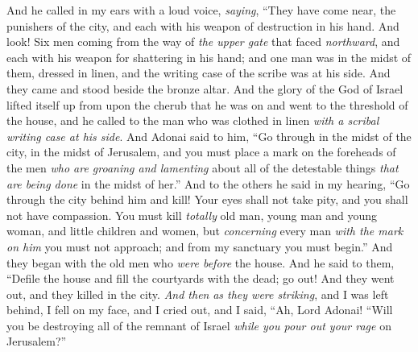 \begin{biblechapter} %
 And he called in my ears with a loud voice, \textit{saying}, “They have come near, the punishers of the city, and each with his weapon of destruction in his hand.
\verse And look! Six men coming from the way of \textit{the upper gate} that faced \textit{northward}, and each with his weapon for shattering in his hand; and one man was in the midst of them, dressed in linen, and the writing case of the scribe was at his side. And they came and stood beside the bronze altar.
\verse And the glory of the God of Israel lifted itself up from upon the cherub that he was on and went to the threshold of the house, and he called to the man who was clothed in linen \textit{with a scribal writing case at his side}.
\verse And Adonai said to him, “Go through in the midst of the city, in the midst of Jerusalem, and you must place a mark on the foreheads of the men \textit{who are groaning and lamenting} about all of the detestable things \textit{that are being done} in the midst of her.”
\verse And to the others he said in my hearing, “Go through the city behind him and kill! Your eyes shall not take pity, and you shall not have compassion.
\verse You must kill \textit{totally} old man, young man and young woman, and little children and women, but \textit{concerning} every man \textit{with the mark on him} you must not approach; and from my sanctuary you must begin.” And they began with the old men who \textit{were before} the house.
\verse And he said to them, “Defile the house and fill the courtyards with the dead; go out! And they went out, and they killed in the city.
\verse \textit{And then} \textit{as they were striking}, and I was left behind, I fell on my face, and I cried out, and I said, “Ah, Lord Adonai! “Will you be destroying all of the remnant of Israel \textit{while you pour out your rage} on Jerusalem?”

\end{biblechapter}
